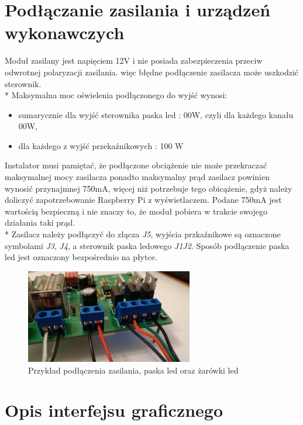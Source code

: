 \documentclass[12pt, eng, twoside, openany, final]{mgr}
\begin{document}
    \section{Podłączanie zasilania i urządzeń wykonawczych}
    Moduł zasilany jest napięciem 12V i nie posiada zabezpieczenia przeciw odwrotnej polaryzacji zasilania. więc błędne podłączenie zasilacza może uszkodzić sterownik. \\*
    Maksymalna moc oświelenia podłączonego do wyjść wynosi:
    \begin{itemize}
        \item sumarycznie dla wyjść sterownika paska led : 00W, czyli dla każdego kanału 00W,
        \item dla każdego z wyjść przekaźnikowych : 100 W
    \end{itemize}
    Instalator musi pamiętać, że podłączone obciążenie nie może przekraczać maksymalnej mocy zasilacza ponadto maksymalny prąd zasilacz powinien wynosić przynajmnej 750mA, więcej niż potrzebuje tego obicążenie, gdyż należy doliczyć zapotrzebowanie Raspberry Pi z wyświetlaczem. Podane 750mA jest wartością bezpieczną i nie znaczy to, że moduł pobiera w trakcie swojego działania taki prąd. \\*
    Zasilacz należy podłączyć do złącza \emph{J5}, wyjścia przkaźnikowe są oznaczone symbolami \emph{J3}, \emph{J4}, a sterownik paska ledowego \emph{J1J2}. Sposób podłączenie paska led jest oznaczony bezpośrednio na płytce. 
        \begin{figure}[H]
        \begin{center}
            \includegraphics[width=0.65\textwidth]{podlaczone.jpg}
            \caption{Przykład podłączenia zasilania, paska led oraz żarówki led}
        \end{center}
        \end{figure}
    
    \section{Opis interfejsu graficznego}
\end{document}
